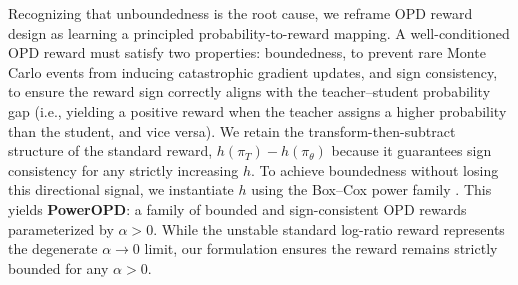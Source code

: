 Recognizing that unboundedness is the root cause, we reframe OPD reward design as learning a principled probability-to-reward mapping. A well-conditioned OPD reward must satisfy two properties: boundedness, to prevent rare Monte Carlo events from inducing catastrophic gradient updates, and sign consistency, to ensure the reward sign correctly aligns with the teacher–student probability gap (i.e., yielding a positive reward when the teacher assigns a higher probability than the student, and vice versa). We retain the transform-then-subtract structure of the standard reward, \(h(\pi_T)-h(\pi_\theta)\) because it guarantees sign consistency for any strictly increasing \(h\). To achieve boundedness without losing this directional signal, we instantiate \(h\) using the Box–Cox power family \citep{boxcox1964}. This yields \textbf{PowerOPD}: a family of bounded and sign-consistent OPD rewards parameterized by \(\alpha>0\). While the unstable standard log-ratio reward represents the degenerate \(\alpha\to0\) limit, our formulation ensures the reward remains strictly bounded for any \(\alpha>0\).

